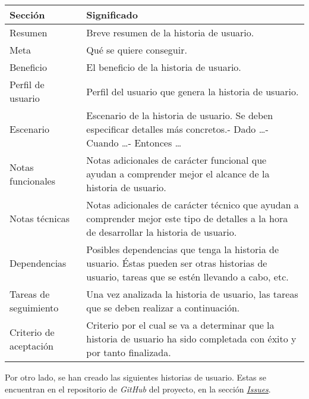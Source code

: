 \begin{table}[H]
    \centering
    \begin{adjustbox}{max width=\textwidth}
    \begin{tabularx}{\textwidth}{|l|L|}
    \hline
        Sección & Significado \\ \hline
        Resumen & Breve resumen de la historia de usuario. \\ \hline
        Meta & Qué se quiere conseguir. \\ \hline
        Beneficio & El beneficio de la historia de usuario. \\ \hline
        Perfil de usuario & Perfil del usuario que genera la historia de usuario. \\ \hline
        Escenario & Escenario de la historia de usuario. Se deben especificar detalles más concretos.\linebreak - Dado …\linebreak - Cuando …\linebreak - Entonces … \\ \hline
        Notas funcionales & Notas adicionales de carácter funcional que ayudan a comprender mejor el alcance de la historia de usuario. \\ \hline
        Notas técnicas & Notas adicionales de carácter técnico que ayudan a comprender mejor este tipo de detalles a la hora de desarrollar la historia de usuario. \\ \hline
        Dependencias & Posibles dependencias que tenga la historia de usuario. Éstas pueden ser otras historias de usuario, tareas que se estén llevando a cabo, etc. \\ \hline
        Tareas de seguimiento & Una vez analizada la historia de usuario, las tareas que se deben realizar a continuación. \\ \hline
        Criterio de aceptación & Criterio por el cual se va a determinar que la historia de usuario ha sido completada con éxito y por tanto finalizada. \\ \hline
    \end{tabularx}
    \end{adjustbox}
\end{table}

\bigskip

Por otro lado, se han creado las siguientes historias de usuario. Estas se encuentran en el repositorio\cite{matroos} de \textit{GitHub} del proyecto, en la sección \href{https://github.com/harvestcore/matroos/labels/US}{\textit{Issues}}.

